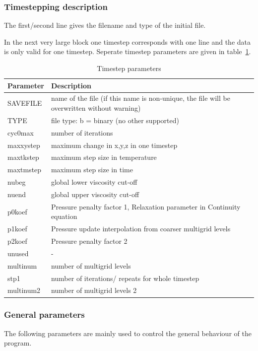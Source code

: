 \subsubsection{Timestepping description}

The first/second line gives the filename and type of the initial file.

In the next very large block one timestep corresponds with one line and the data is only valid for one timestep. Seperate timestep parameters are given in table~\ref{tbl:timestep_parameters}.

\begin{table}[H]
\small
\centering
\begin{tabular}{l p{13cm}}
\toprule
Parameter & Description \\
\midrule
SAVEFILE & name of the file (if this name is non-unique, the file will be overwritten without warning) \\
TYPE & file type: b = binary (no other supported) \\
cyc0max & number of iterations \\
maxxystep & maximum change in x,y,z in one timestep  \\
maxtkstep & maximum step size in temperature \ \\
maxtmstep & maximum step size in time \\
nubeg & global lower viscosity cut-off \\
nuend & global upper viscosity cut-off \\
p0koef & Pressure penalty factor 1, Relaxation parameter in Continuity equation \\
p1koef & Pressure update interpolation from coarser multigrid levels \\
p2koef & Pressure penalty factor 2 \todo{???} \\
unused & - \\
multinum &  number of multigrid levels \\
stp1 & number of iterations/ repeats for whole timestep \\
multinum2 & number of multigrid levels 2 \todo{???} \\
\bottomrule
\end{tabular}
\caption{Timestep parameters}
\label{tbl:timestep_parameters}
\end{table}

\subsubsection{General parameters}
The following parameters are mainly used to control the general behaviour of the program.

